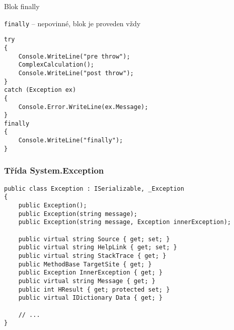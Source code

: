 \begin{frame}[fragile]
\begin{bitemize}{Blok finally}
\item \lstinline|finally| -- nepovinné, blok je proveden vždy
\end{bitemize}
\vfill
\begin{yesblock}
\begin{lstlisting}
try
{
    Console.WriteLine("pre throw");
    ComplexCalculation();
    Console.WriteLine("post throw");
}
catch (Exception ex)
{
    Console.Error.WriteLine(ex.Message);
}
finally
{
    Console.WriteLine("finally");
}
\end{lstlisting}
\end{yesblock}
\end{frame}





\begin{frame}[fragile]
\frametitle{Třída System.Exception}
\begin{noteblock}{}
\begin{lstlisting}
public class Exception : ISerializable, _Exception
{
    public Exception();
    public Exception(string message);
    public Exception(string message, Exception innerException);

    public virtual string Source { get; set; }
    public virtual string HelpLink { get; set; }
    public virtual string StackTrace { get; }
    public MethodBase TargetSite { get; }
    public Exception InnerException { get; }
    public virtual string Message { get; }
    public int HResult { get; protected set; }
    public virtual IDictionary Data { get; }
    
    // ...
}
\end{lstlisting}
\end{noteblock}

\end{frame}



